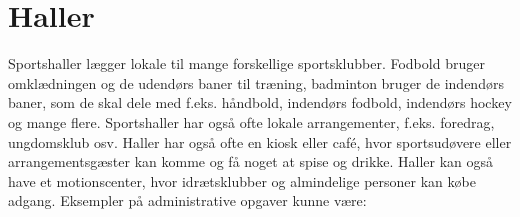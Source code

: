 








\section{Haller}

Sportshaller lægger lokale til mange forskellige sportsklubber. Fodbold bruger omklædningen og de
udendørs baner til træning, badminton bruger de indendørs baner, som de skal dele med f.eks. håndbold,
indendørs fodbold, indendørs hockey og mange flere. Sportshaller har også ofte lokale arrangementer, f.eks.
foredrag, ungdomsklub osv. Haller har også ofte en kiosk eller café, hvor sportsudøvere eller
arrangementsgæster kan komme og få noget at spise og drikke. Haller kan også have et motionscenter, hvor
idrætsklubber og almindelige personer kan købe adgang\citep{spt_hal}. Eksempler på administrative opgaver
kunne være:

